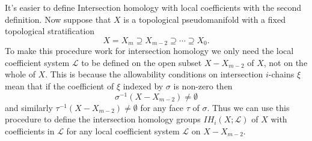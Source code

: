 \documentclass[11pt]{article}
\begin{document}
It's easier to define Intersection homology with local coefficients with the second definition. Now suppose that $X$ is a topological pseudomanifold with a fixed topological stratification
$$
X=X_m \supseteq X_{m-2} \supseteq \cdots \supseteq X_0 .
$$ To make this procedure work for intersection homology we only need the local coefficient system $\mathcal{L}$ to be defined on the open subset $X-X_{m-2}$ of $X$, not on the whole of $X$. This is because the allowability conditions on intersection $i$-chains $\xi$ mean that if the coefficient of $\xi$ indexed by $\sigma$ is non-zero then
$$
\sigma^{-1}\left(X-X_{m-2}\right) \neq \emptyset
$$ and similarly $\tau^{-1}\left(X-X_{m-2}\right) \neq \emptyset$ for any face $\tau$ of $\sigma$. Thus we can use this procedure to define the intersection homology groups $I H_i(X ; \mathcal{L})$ of $X$ with coefficients in $\mathcal{L}$ for any local coefficient system $\mathcal{L}$ on $X-X_{m-2}$.
\end{document}
